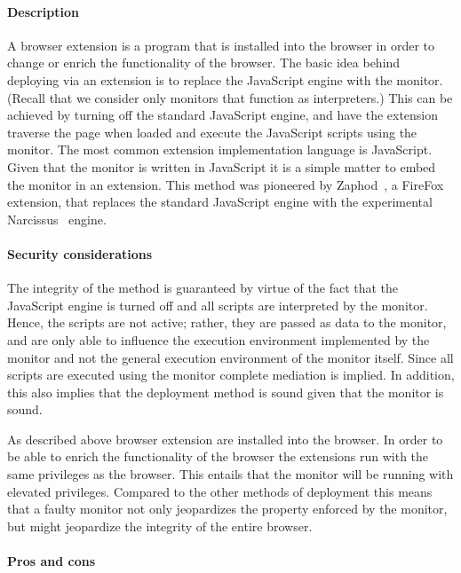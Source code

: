 \documentclass{llncs}
\begin{document}
\paragraph{Description}

A browser extension is a program that is installed into the browser in order to
change or enrich the functionality of the browser.  The basic idea behind
deploying via an extension is to replace the JavaScript engine with the monitor.
(Recall that we consider only monitors that function as interpreters.)
%
This can be achieved by turning off the standard JavaScript engine, and have
the extension traverse the page when loaded and execute the JavaScript scripts
using the monitor. 
%
The most common extension implementation language is JavaScript. Given that
the monitor is written in JavaScript it is a simple matter to embed the 
monitor in an extension.
This method was pioneered by Zaphod~\cite{Zaphod}, a
FireFox extension, that replaces the standard JavaScript engine with the
experimental Narcissus~\cite{Narcissus} engine.

\paragraph{Security considerations}

The integrity of the method is guaranteed by virtue of the fact that the
JavaScript engine is turned off and all scripts are interpreted by the monitor.
Hence, the scripts are not active; rather, they are passed as data to the
monitor, and are only able to influence the execution environment implemented
by the monitor and not the general execution environment of the monitor itself.
Since all scripts are executed using the monitor complete mediation is implied.
In addition, this also implies that the deployment method is sound given that
the monitor is sound. 

As described above browser extension are installed into the browser. In order
to be able to enrich the functionality of the browser the extensions run with
the same privileges as the browser. This entails that the monitor will be
running with elevated privileges. Compared to the other methods of deployment
this means that a faulty monitor not only jeopardizes the property enforced by
the monitor, but might jeopardize the integrity of the entire browser.

\paragraph{Pros and cons}
\end{document}
